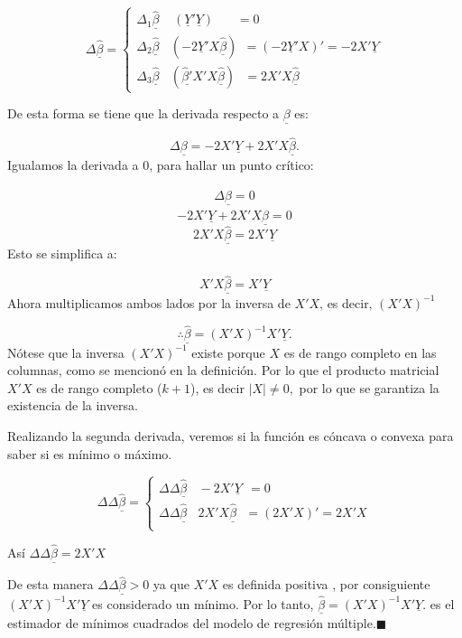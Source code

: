 \documentclass[
  a4paper,
  oneside,
  openany]{book}
\begin{document}
\[
\Delta\underline{\hat{\beta}}=\left\{
\begin{array}{ll}
\Delta_{1} \underline{\hat{\beta}} \ \ \ \ \ \left(\underline{Y}'\underline{Y}\right)  \ \ \ \ \ \ \ \ =0 \\
\Delta_{2} \underline{\hat{\beta}} \ \ \ \ \left( -2\underline{Y}'X\underline{\hat{\beta}}\right) \ \ = \left(-2\underline{Y}'X\right)'=-2X'\underline{Y} \\
\Delta_{3} \underline{\hat{\beta}} \ \  \ \ \left( \underline{\hat{\beta}'}X'X\underline{\hat{\beta}}\right)  \ \ \ = 2X'X\underline{\hat{\beta}}
\end{array}
\right. 
\]

De esta forma se tiene que la derivada respecto a \(\underline{\beta}\) es:

\[\Delta \underline{\beta}=-2X'\underline{Y}+2X'X\underline{\hat{\beta}}.\]
Igualamos la derivada a 0, para hallar un punto crítico:

\[\Delta \underline{\hat{\beta}}=0\]
\[-2X'\underline{Y}+2X'X\underline{\hat{\beta}}=0\]
\[2X'X\underline{\hat{\beta}}=2X'\underline{Y}\]
Esto se simplifica a:

\[X'X\underline{\hat{\beta}}=X'\underline{Y}\]
Ahora multiplicamos ambos lados por la inversa de \(X'X\), es decir, \((X'X)^{-1}\)

\[\therefore \underline{\hat{\beta}}=\left(X'X\right)^{-1}X'\underline{Y}.\]
Nótese que la inversa \(\left(X'X\right)^{-1}\) existe porque \(X\) es de rango completo en las columnas, como se mencionó en la definición. Por lo que el producto matricial \(X'X\) es de rango completo (\(k+1\)), es decir \(|X|\neq 0,\) por lo que se garantiza la existencia de la inversa.

Realizando la segunda derivada, veremos si la función es cóncava o convexa para saber si es mínimo o máximo.

\[\Delta \Delta \underline{\hat{\beta}}=\left\{
\begin{array}{ll}
\Delta \Delta \underline{\hat{\beta}} \ \ \ \ -2X' \underline{Y} \ \ =0 \\
\Delta \Delta \underline{\hat{\beta}} \ \ \ \ 2X'X \underline{\hat{\beta}}  \ \ \ = \left(2X'X\right)' =2X'X \\
\end{array}
\right.\]

Así \(\Delta \Delta \underline{\hat{\beta}}=2X'X\)

De esta manera \(\Delta \Delta \underline{\hat{\beta}}>0\) ya que \(X'X\) es definida positiva , por consiguiente \((X'X)^{-1}X'\underline{Y}\) es considerado un mínimo. Por lo tanto, \(\underline{\hat{\beta}}=\left(X'X\right)^{-1}X'\underline{Y}.\) es el estimador de mínimos cuadrados del modelo de regresión múltiple.\(\blacksquare\)
\end{document}
